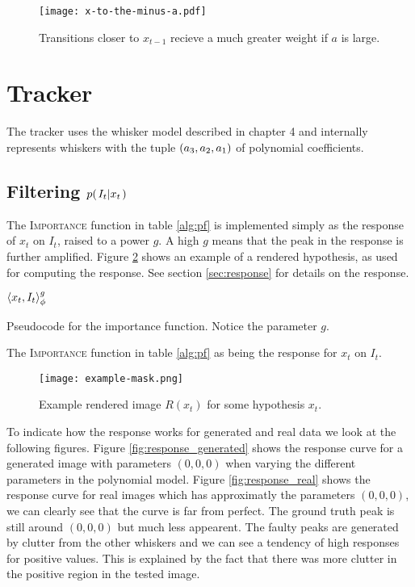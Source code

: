 \begin{figure}[ht]
  \centering
  \texttt{[image: x-to-the-minus-a.pdf]}
  \caption{Transitions closer to $x_{t-1}$ recieve a much greater
    weight if $a$ is large.}
  \label{fig:x-to-the-minus-a}
\end{figure}

\section{Tracker}

The tracker uses the whisker model described in chapter 4 and
internally represents whiskers with the tuple $\left( a_3, a_2, a_1 \right)$ of polynomial
coefficients.

\subsection{Filtering $p{(\left. I_t \middle\vert x_t \right.)}$}
\label{sec:filtering}
The \textsc{Importance} function in table \ref{alg:pf} is implemented
simply as the response of $x_t$ on $I_t$, raised to a power $g$. A
high $g$ means that the peak in the response is further
amplified. Figure \ref{fig:example-mask} shows an example of a
rendered hypothesis, as used for computing the response. See section
\ref{sec:response} for details on the response.

\begin{table}[h]
  \begin{codebox}
    \li \Return $\langle x_t, I_t\rangle_{\phi}^g$
  \end{codebox}
  \caption{Pseudocode for the importance function. Notice the parameter $g$.}
  \label{alg:importance}
\end{table}

The \textsc{Importance} function in table \ref{alg:pf} as being the response for $x_t$ on $I_t$.
\begin{figure}[h]
  \centering
  \texttt{[image: example-mask.png]}
  \caption{Example rendered image $R(x_t)$ for some hypothesis $x_t$.}
  \label{fig:example-mask}
\end{figure}

To indicate how the response works for generated and real data we look at the following figures.
Figure \ref{fig:response_generated} shows the response curve for a generated image with parameters $(0,0,0)$ when varying the different parameters in the polynomial model.
Figure \ref{fig:response_real} shows the response curve for real images which has approximatly the parameters $(0,0,0)$, we can clearly see that the curve is far from perfect. 
The ground truth peak is still around $(0,0,0)$ but much less appearent.
The faulty peaks are generated by clutter from the other whiskers and
we can see a tendency of high responses for positive values. This is
explained by the fact that there was more clutter in the positive
region in the tested image.


